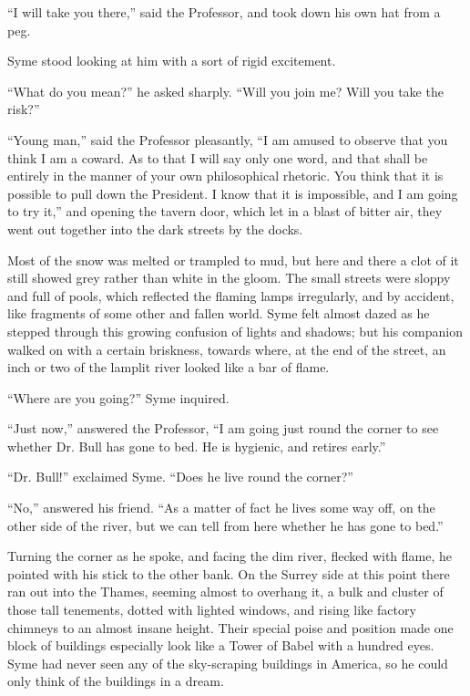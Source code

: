 “I will take you there,” said the Professor, and took down his own hat from a peg.

Syme stood looking at him with a sort of rigid excitement.

“What do you mean?” he asked sharply. “Will you join me? Will you take the risk?”

“Young man,” said the Professor pleasantly, “I am amused to observe that you think I am a coward. As to that I will say only one word, and that shall be entirely in the manner of your own philosophical rhetoric. You think that it is possible to pull down the President. I know that it is impossible, and I am going to try it,” and opening the tavern door, which let in a blast of bitter air, they went out together into the dark streets by the docks.

Most of the snow was melted or trampled to mud, but here and there a clot of it still showed grey rather than white in the gloom. The small streets were sloppy and full of pools, which reflected the flaming lamps irregularly, and by accident, like fragments of some other and fallen world. Syme felt almost dazed as he stepped through this growing confusion of lights and shadows; but his companion walked on with a certain briskness, towards where, at the end of the street, an inch or two of the lamplit river looked like a bar of flame.

“Where are you going?” Syme inquired.

“Just now,” answered the Professor, “I am going just round the corner to see whether Dr. Bull has gone to bed. He is hygienic, and retires early.”

“Dr. Bull!” exclaimed Syme. “Does he live round the corner?”

“No,” answered his friend. “As a matter of fact he lives some way off, on the other side of the river, but we can tell from here whether he has gone to bed.”

Turning the corner as he spoke, and facing the dim river, flecked with flame, he pointed with his stick to the other bank. On the Surrey side at this point there ran out into the Thames, seeming almost to overhang it, a bulk and cluster of those tall tenements, dotted with lighted windows, and rising like factory chimneys to an almost insane height. Their special poise and position made one block of buildings especially look like a Tower of Babel with a hundred eyes. Syme had never seen any of the sky-scraping buildings in America, so he could only think of the buildings in a dream.

